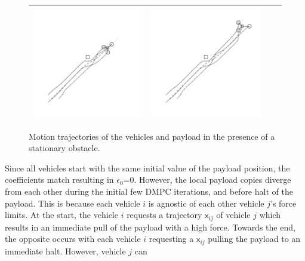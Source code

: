 \documentclass[letterpaper, 10 pt, conference]{ieeeconf}
\newcommand{\cx}{\textsf{x}}
\begin{document}
\begin{figure}[t]
\begin{tabular}[t]{|c|c|c|c|}
				\includegraphics[scale=0.65]{figures/obstacle_2_tikz_gray.pdf} &
				\includegraphics[scale=0.65]{figures/obstacle_3_tikz_gray.pdf} \\
			\hline
		\end{tabular}
	\caption{Motion trajectories of the vehicles and payload in the presence of a stationary obstacle.}
	\label{obstacle}
\end{figure}
Since all vehicles start with the same initial value of the payload position, the coefficients match resulting in $\epsilon_0$=0. However, the local payload copies diverge from each other during the initial few DMPC iterations, and before halt of the payload. This is because each vehicle $i$ is agnostic of each other vehicle $j$'s force limits. At the start, the vehicle $i$ requests a trajectory $\cx_{ij}$ of vehicle $j$ which results in an immediate pull of the payload with a high force. Towards the end, the opposite occurs with each vehicle $i$ requesting a $\cx_{ij}$ pulling the payload to an immediate halt. However, vehicle $j$ can
\end{document}
